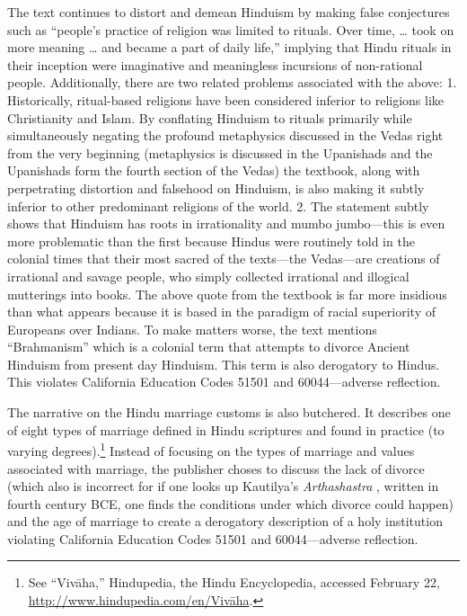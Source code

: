 The text continues to distort and demean Hinduism by making false conjectures such as “people’s practice of religion was limited to rituals. Over time, … took on more meaning … and became a part of daily life,” implying that Hindu rituals in their inception were imaginative and meaningless incursions of non-rational people. Additionally, there are two related problems associated with the above: 1. Historically, ritual-based religions have been considered inferior to religions like Christianity and Islam. By conflating Hinduism to rituals primarily while simultaneously negating the profound metaphysics discussed in the Vedas right from the very beginning (metaphysics is discussed in the Upanishads and the Upanishads form the fourth section of the Vedas) the textbook, along with perpetrating distortion and falsehood on Hinduism, is also making it subtly inferior to other predominant religions of the world. 2. The statement subtly shows that Hinduism has roots in irrationality and mumbo jumbo—this is even more problematic than the first because Hindus were routinely told in the colonial times that their most sacred of the texts—the Vedas—are creations of irrational and savage people, who simply collected irrational and illogical mutterings into books. The above quote from the textbook is far more insidious than what appears because it is based in the paradigm of racial superiority of Europeans over Indians. To make matters worse, the text mentions “Brahmanism” which is a colonial term that attempts to divorce Ancient Hinduism from present day Hinduism. This term is also derogatory to Hindus. This violates California Education Codes 51501 and 60044—adverse reflection.  

The narrative on the Hindu marriage customs is also butchered. It describes one of eight types of marriage defined in Hindu scriptures and found in practice (to varying degrees).\footnote{See “Vivāha,” Hindupedia, the Hindu Encyclopedia, accessed 	February 22, \url{http://www.hindupedia.com/en/Vivāha}.} Instead of focusing on the types of marriage and values associated with marriage, the publisher choses to discuss the lack of divorce (which also is incorrect for if one looks up Kautilya’s \textit{Arthashastra} , written in fourth century BCE, one finds the conditions under which divorce could happen) and the age of marriage to create a derogatory description of a holy institution violating California Education Codes 51501 and 60044—adverse reflection.  

